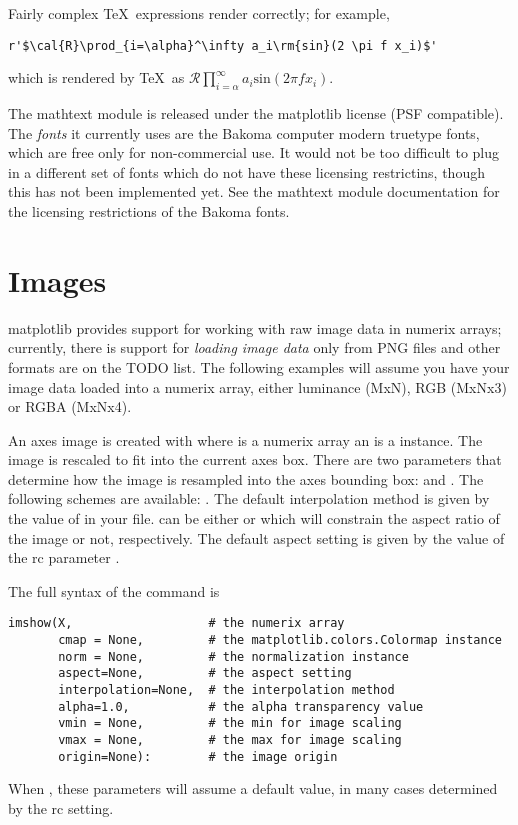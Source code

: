 \documentclass[twoside,10pt]{book}
\begin{document}
\noindent Fairly complex \TeX\ expressions render correctly; for example, 
\begin{lstlisting}
r'$\cal{R}\prod_{i=\alpha}^\infty a_i\rm{sin}(2 \pi f x_i)$'
\end{lstlisting}
which is rendered by \TeX\ as $\mathcal{R}\prod_{i=\alpha}^\infty
a_i\mathrm{sin}(2 \pi f x_i)$.  

The mathtext module is released under the matplotlib license (PSF
compatible).  The \textit{fonts} it currently uses are the Bakoma
computer modern truetype fonts, which are free only for non-commercial
use.  It would not be too difficult to plug in a different set of
fonts which do not have these licensing restrictins, though this has
not been implemented yet.  See the mathtext module documentation for
the licensing restrictions of the Bakoma fonts.

\section*{\myheadersize Images}

matplotlib provides support for working with raw image data in numerix
arrays; currently, there is support for \textit{loading image data}
only from PNG files and other formats are on the TODO list.  The
following examples will assume you have your image data loaded into a
numerix array, either luminance (MxN), RGB (MxNx3) or RGBA (MxNx4).

An axes image is created with  where  is
a numerix array an  is a 
instance.  The image is rescaled to fit into the current axes box.
There are two parameters that determine how the image is resampled
into the axes bounding box:  and .
The following  schemes are available:
.  The default
interpolation method is given by the value of 
in your  file.   can be either
 or  which will constrain the aspect ratio of
the image or not, respectively.  The default aspect setting is given
by the value of the rc parameter .

The full syntax of the  command is
\begin{lstlisting}
imshow(X,                   # the numerix array
       cmap = None,         # the matplotlib.colors.Colormap instance
       norm = None,         # the normalization instance
       aspect=None,         # the aspect setting
       interpolation=None,  # the interpolation method
       alpha=1.0,           # the alpha transparency value
       vmin = None,         # the min for image scaling 
       vmax = None,         # the max for image scaling
       origin=None):        # the image origin

\end{lstlisting}
When , these parameters will assume a default value, in many
cases determined by the rc setting.  
\end{document}
